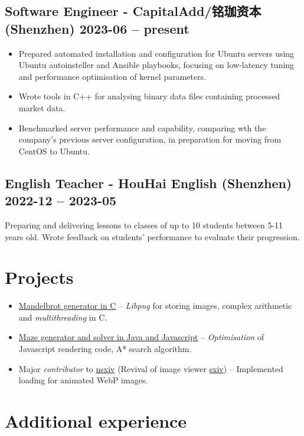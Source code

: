 \subsection{Software Engineer - CapitalAdd/铭珈资本 (Shenzhen) \hfill 2023-06 --
present}
\begin{itemize}
    \item Prepared automated installation and configuration for Ubuntu servers
        using Ubuntu autoinsteller and Ansible playbooks, focusing on
        low-latency tuning and performance optimisation of kernel parameters.
    \item Wrote tools in C++ for analysing binary data files containing
        processed market data.
    \item Benchmarked server performance and capability, comparing wth the
        company's previous server configuration, in preparation for moving from
        CentOS to Ubuntu.
\end{itemize}

\subsection{English Teacher - HouHai English (Shenzhen) \hfill 2022-12 --
2023-05}
Preparing and delivering lessons to classes of up to 10 students between
5-11 years old. Wrote feedback on students' performance to evaluate their
progression.

\section{Projects}
        \begin{itemize}
            \item \href{https://github.com/Ytrewq13/mandelbrotc}{Mandelbrot generator in C}
    -- \emph{Libpng} for storing images, complex arithmetic and
    \emph{multithreading} in C.
            \item \href{https://github.com/Ytrewq13/mazemaker.git}{Maze generator and solver in Java and Javascript}
    -- \emph{Optimisation} of Javascript rendering code, A* search algorithm.
            \item Major \emph{contributor} to
                \href{https://github.com/nsxiv/nsxiv.git}{nsxiv} (Revival of
                image viewer \href{https://github.com/muennich/sxiv}{sxiv})
    -- Implemented loading for animated WebP images.
        \end{itemize}
\section{Additional experience}
